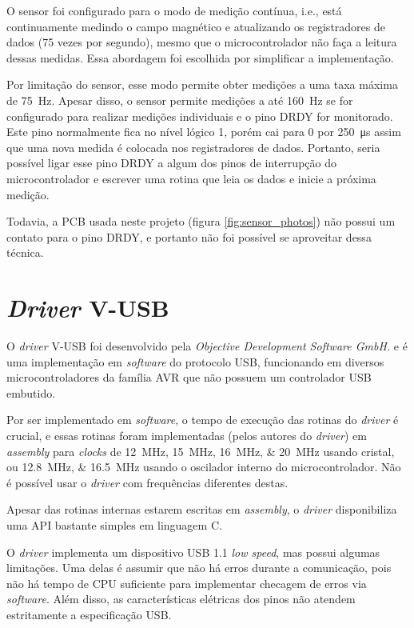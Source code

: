 \documentclass[brazil,pagestart=firstchapter]{abnt}
\makeatletter
\newcommand*{\ie}{i.e.\@\xspace}
\newcommand*{\VUSB}{\mbox{V-USB}\xspace}
\makeatother
\begin{document}
O sensor foi configurado para o modo de medição contínua, \ie, está
continuamente medindo o campo magnético e atualizando os registradores de
dados (75 vezes por segundo), mesmo que o microcontrolador não faça a
leitura dessas medidas. Essa abordagem foi escolhida por simplificar a
implementação.

Por limitação do sensor, esse modo permite obter medições a uma taxa máxima
de \SI{75}{\hertz}. Apesar disso, o sensor permite medições a até
\SI{160}{\hertz} se for configurado para realizar medições individuais e o
pino DRDY for monitorado. \cite[p.~12]{HMC5883L} Este pino normalmente fica
no nível lógico 1, porém cai para 0 por \SI{250}{\micro\second} assim que
uma nova medida é colocada nos registradores de dados. \cite[p.~3]{HMC5883L}
Portanto, seria possível ligar esse pino DRDY a algum dos pinos de
interrupção do microcontrolador e escrever uma rotina que leia os dados e
inicie a próxima medição.

Todavia, a \ac{PCB} usada neste projeto (figura \ref{fig:sensor_photos}) não
possui um contato para o pino DRDY, e portanto não foi possível se
aproveitar dessa técnica.


\section{\textit{Driver} \VUSB}
\label{sec:vusb}

O \textit{driver} \VUSB foi desenvolvido pela \textit{Objective Development
Software GmbH.} e é uma implementação em \textit{software} do protocolo
\ac{USB}, funcionando em diversos microcontroladores da família AVR que não
possuem um controlador \ac{USB} embutido. \cite{VUSBdriver}

Por ser implementado em \textit{software}, o tempo de execução das rotinas
do \textit{driver} é crucial, e essas rotinas foram implementadas (pelos
autores do \textit{driver}) em \textit{assembly} para \textit{clocks} de
\SIlist[list-final-separator={ ou }]{12; 15; 16; 20}{\mega\hertz} usando
cristal, ou \SIlist[list-final-separator={ ou }]{12.8; 16.5}{\mega\hertz}
usando o oscilador interno do microcontrolador. Não é possível usar o
\textit{driver} com frequências diferentes destas. \cite{VUSBdriver}

Apesar das rotinas internas estarem escritas em \textit{assembly}, o
\textit{driver} disponibiliza uma \ac{API} bastante simples em linguagem C.

O \textit{driver} implementa um dispositivo \ac{USB} 1.1 \textit{low speed},
mas possui algumas limitações. Uma delas é assumir que não há erros durante
a comunicação, pois não há tempo de CPU suficiente para implementar checagem
de erros via \textit{software}. Além disso, as características elétricas dos
pinos não atendem estritamente a especificação \ac{USB}. \cite{VUSBdriver}
\end{document}
